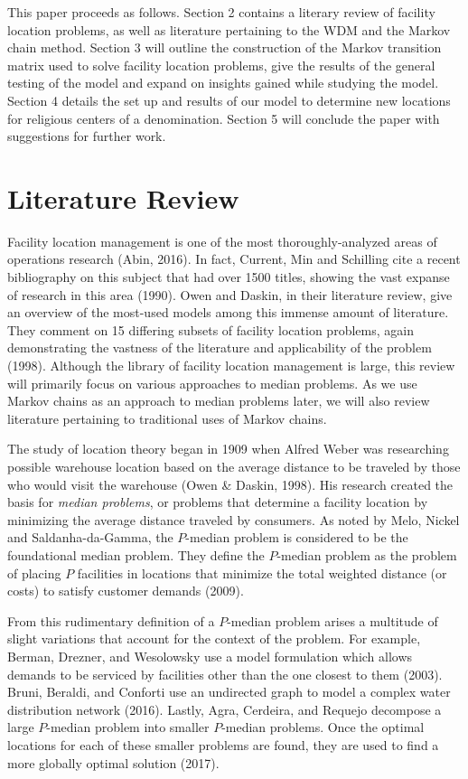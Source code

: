 \documentclass[twoside,twocolumn]{article}
\begin{document}
This paper proceeds as follows.
Section 2 contains a literary review of facility location problems, as well as literature pertaining to the WDM and the Markov chain method.
Section 3 will outline the construction of the Markov transition matrix used to solve facility location problems, give the results of the general testing of the model and expand on insights gained while studying the model.
Section 4 details the set up and results of our model to determine new locations for religious centers of a denomination.
Section 5 will conclude the paper with suggestions for further work.

\section{Literature Review}

Facility location management is one of the most thoroughly-analyzed areas of operations research (Abin, 2016).
In fact, Current, Min and Schilling cite a recent bibliography on this subject that had over 1500 titles, showing the vast expanse of research in this area (1990).
Owen and Daskin, in their literature review, give an overview of the most-used models among this immense amount of literature.
They comment on 15 differing subsets of facility location problems, again demonstrating the vastness of the literature and applicability of the problem (1998).
Although the library of facility location management is large, this review will primarily focus on various approaches to median problems.
As we use Markov chains as an approach to median problems later, we will also review literature pertaining to traditional uses of Markov chains.

The study of location theory began in 1909 when Alfred Weber was researching possible warehouse location based on the average distance to be traveled by those who would visit the warehouse (Owen \& Daskin, 1998).
His research created the basis for {\em median problems}, or problems that determine a facility location by minimizing the average distance traveled by consumers.
As noted by Melo, Nickel and Saldanha-da-Gamma, the $P$-median problem is considered to be the foundational median problem.
They define the $P$-median problem as the problem of placing $P$ facilities in locations that minimize the total weighted distance (or costs) to satisfy customer demands (2009).

From this rudimentary definition of a $P$-median problem arises a multitude of slight variations that account for the context of the problem.
For example, Berman, Drezner, and Wesolowsky use a model formulation which allows demands to be serviced by facilities other than the one closest to them (2003).
Bruni, Beraldi, and Conforti use an undirected graph to model a complex water distribution network (2016).
Lastly, Agra, Cerdeira, and Requejo decompose a large $P$-median problem into smaller $P$-median problems.
Once the optimal locations for each of these smaller problems are found, they are used to find a more globally optimal solution (2017).
\end{document}
